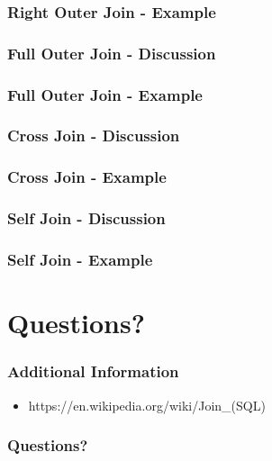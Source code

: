 \documentclass{beamer}
\begin{document}
\begin{frame}
  \frametitle{Right Outer Join - Example}
  
\end{frame}

\begin{frame}
  \frametitle{Full Outer Join - Discussion}
  
\end{frame}

\begin{frame}
  \frametitle{Full Outer Join - Example}
  
\end{frame}

\begin{frame}
  \frametitle{Cross Join - Discussion}
  
\end{frame}

\begin{frame}
  \frametitle{Cross Join - Example}
  
\end{frame}

\begin{frame}
  \frametitle{Self Join - Discussion}
  
\end{frame}

\begin{frame}
  \frametitle{Self Join - Example}
  
\end{frame}


\section{Questions?}

\begin{frame}
  \frametitle{Additional Information}
  \begin{itemize}
  \item https://en.wikipedia.org/wiki/Join\_(SQL)
  \end{itemize}
\end{frame}

\begin{frame}
 \frametitle{Questions?}

\end{frame}
\end{document}
